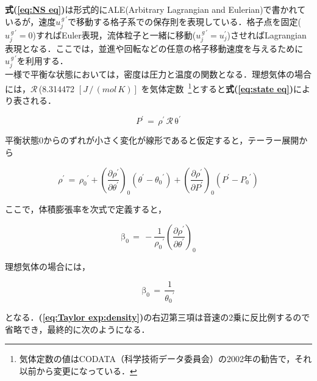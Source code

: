 \noindent \textbf{式(\ref{eq:NS eq})}は形式的にALE(Arbitrary Lagrangian and Eulerian)で書かれているが，速度$u_j^{\,g\,\prime}$で移動する格子系での保存則を表現している．格子点を固定($u_j^{\,g\,\prime}=0$)すればEuler表現，流体粒子と一緒に移動($u_j^{\,g\,\prime}=u_j^\prime$)させればLagrangian表現となる．ここでは，並進や回転などの任意の格子移動速度を与えるために$u_j^{\,g\,\prime}$を利用する．\\

一様で平衡な状態においては，密度は圧力と温度の関数となる．理想気体の場合には，$\mathcal{R}$\,(8.314472 $[J\,/\,(mol\,K)]$ を気体定数~\cite{codataR}\footnote{気体定数の値はCODATA（科学技術データ委員会）の2002年の勧告で，それ以前から変更になっている．}とすると\textbf{式(\ref{eq:state eq})}により表される．

\begin{equation}
{P}^{\prime}\,{=}\,\rho^{\prime}\,\mathcal{R}\,\mathrm{\theta}^{\prime}
\label{eq:state eq}
\end{equation}

\noindent 平衡状態0からのずれが小さく変化が線形であると仮定すると，テーラー展開から

\begin{equation}
\rho^{\prime}
\, = \,
{\rho_{0}}^{\prime} + {\left( { \frac{\partial \rho^{\prime}} {\partial \theta^{\prime}} } \right)}_{0} \left( \theta^{\prime} - {\theta_{0}}^{\prime} \right) + {\left( { \frac{\partial\rho^{\prime}}{\partial{P}^{\prime}} } \right)}_{0} \left( { P^{\prime} - {P_{0}}^{\prime} } \right)
\label{eq:Taylor exp:density}
\end{equation}

\noindent ここで，体積膨張率を次式で定義すると，

\begin{equation}
{\mathrm{\beta}}_{0}
\,{=}\,
{-}\frac{1}{{{\rho}_{0}}^{\prime}} {\left( {\frac{\partial{\rho}^{\prime}}{\partial{\theta}^{\prime}}} \right) }_{0}
\end{equation}

\noindent 理想気体の場合には，

\begin{equation}
{\mathrm{\beta}}_{0}\,{=}\,\frac{1}{{\theta_{0}}^{\prime}}
\end{equation}

\noindent となる．\textbf{(\ref{eq:Taylor exp:density})}の右辺第三項は音速の2乗に反比例するので省略でき，最終的に次のようになる．

